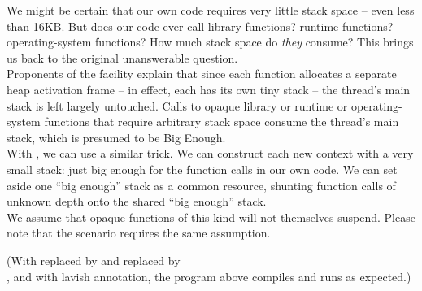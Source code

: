 We might be certain that our own code requires very little stack space -- even
less than 16KB. But does our code ever call library functions? runtime
functions? operating-system functions? How much stack space do \emph{they}
consume? This brings us back to the original unanswerable question.\\

Proponents of the \coawait facility explain that since each \coawait function
allocates a separate heap activation frame -- in effect, each has its own tiny
stack -- the thread's main stack is left largely untouched. Calls to opaque
library or runtime or operating-system functions that require arbitrary stack
space consume the thread's main stack, which is presumed to be Big Enough.\\

With \cc, we can use a similar trick. We can construct each new context with a
very small stack: just big enough for the function calls in our own code. We
can set aside one ``big enough'' stack as a common resource, shunting function
calls of unknown depth onto the shared ``big enough'' stack.\\

We assume that opaque functions of this kind will not themselves suspend.
Please note that the \coawait scenario requires the same assumption.\\


(With \callcc replaced by  and \cont replaced by\\
, and with lavish 
annotation, the program above compiles and runs as expected.)
